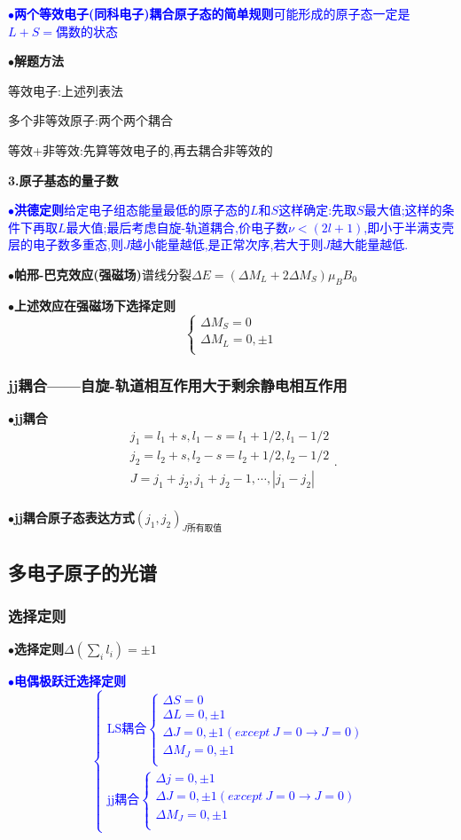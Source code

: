 \documentclass[UTF8]{article}
\newcommand{\keypoint}[2]{$\bullet$\textbf{#1}\quad#2\par}
\begin{document}
\textcolor{blue}{\keypoint{两个等效电子(同科电子)耦合原子态的简单规则}{可能形成的原子态一定是$L+S=$偶数的状态}}
\keypoint{解题方法}{\par
	等效电子:上述列表法\par
	多个非等效原子:两个两个耦合\par
	等效+非等效:先算等效电子的,再去耦合非等效的\par
}
\textbf{3.原子基态的量子数}\par
\textcolor{blue}{\keypoint{洪德定则}{给定电子组态能量最低的原子态的$L$和$S$这样确定:先取$S$最大值;这样的条件下再取$L$最大值;最后考虑自旋-轨道耦合,价电子数$\nu<(2l+1)$,即小于半满支壳层的电子数多重态,则$J$越小能量越低,是正常次序,若大于则$J$越大能量越低.}}
\keypoint{帕邢-巴克效应(强磁场)}{谱线分裂$\Delta E=(\Delta M_L+2\Delta M_S)\mu_BB_0$}
\keypoint{上述效应在强磁场下选择定则}{
	$$ 
	\left\{
	\begin{array}{l}
	\Delta M_S=0\\
	\Delta M_L=0,\pm1\\
	\end{array}
	\right.
	$$
}
\subsubsection{jj耦合——自旋-轨道相互作用大于剩余静电相互作用}
\keypoint{jj耦合}{
	$$
	\begin{array}{l}
	j_1=l_1+s,l_1-s=l_1+1/2,l_1-1/2\\
	j_2=l_2+s,l_2-s=l_2+1/2,l_2-1/2\\
	J=j_1+j_2,j_1+j_2-1,\cdots,|j_1-j_2|\\
	\end{array}
	.$$
}
\keypoint{jj耦合原子态表达方式}{$(j_1,j_2)_{J\mbox{所有取值}}$}
\subsection{多电子原子的光谱}
\subsubsection{选择定则}
\keypoint{选择定则}{$\Delta\left(\sum\limits_{i}l_i\right)=\pm1$}
\textcolor{blue}{\keypoint{电偶极跃迁选择定则}{
	$$
	\left\{
	\begin{array}{l}
	\mbox{LS耦合}
	\left\{
	\begin{array}{l}
	\Delta S=0\\
	\Delta L=0,\pm1\\
	\Delta J=0,\pm1(except\ J=0\rightarrow J=0)\\
	\Delta M_J=0,\pm1\\
	\end{array}
	\right.\\
	\mbox{jj耦合}
	\left\{
	\begin{array}{l}
	\Delta j=0,\pm1\\
	\Delta J=0,\pm1(except\ J=0\rightarrow J=0)\\
	\Delta M_J=0,\pm1\\
	\end{array}
	\right.
	\end{array}
	\right.
	$$
}}
\end{document}
